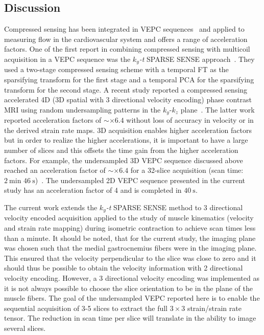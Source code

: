 \subsection{Discussion}
Compressed sensing has been integrated in VEPC sequences~\cite{RNCS9, RNCS10} and applied to measuring flow in the cardiovascular system and offers a range of acceleration factors. 
One of the first report in combining compressed sensing with multicoil acquisition in a VEPC sequence was the $k_y$\textit{-t} SPARSE SENSE approach~\cite{RNCS9, RNCS10}. 
They used a two-stage compressed sensing scheme with a temporal FT as the sparsifying transform for the first stage and a temporal PCA for the sparsifying transform for the second stage. 
A recent study reported a compressed sensing accelerated 4D (3D spatial with 3 directional velocity encoding) phase contrast MRI using random undersampling patterns in the $k_y$-$k_z$ plane~\cite{RNCS11}.
The latter work reported acceleration factors of $\sim \times 6.4$ without loss of accuracy in velocity or in the derived strain rate maps. 
3D acquisition enables higher acceleration factors but in order to realize the higher accelerations, it is important to have a large number of slices and this offsets the time gain from the higher acceleration factors. 
For example, the undersampled 3D VEPC sequence discussed above reached an acceleration factor of $\sim \times 6.4$ for a 32-slice acquisition (scan time: $\SI{2}{\minute}$ $\SI{46}{\second}$)~\cite{RNCS11}. 
The undersampled 2D VEPC sequence presented in the current study has an acceleration factor of 4 and is completed in $\SI{40}{\second}$.

The current work extends the $k_y$\textit{-t} SPARSE SENSE method to 3 directional velocity encoded acquisition applied to the study of muscle kinematics (velocity and strain rate mapping) during isometric contraction to achieve scan times less than a minute. 
It should be noted, that for the current study, the imaging plane was chosen such that the medial gastrocnemius fibers were in the imaging plane. 
This ensured that the velocity perpendicular to the slice was close to zero and it should thus be possible to obtain the velocity information with 2 directional velocity encoding. 
However, a 3 directional velocity encoding was implemented as it is not always possible to choose the slice orientation to be in the plane of the muscle fibers.
The goal of the undersampled VEPC reported here is to enable the sequential acquisition of 3-5 slices to extract the full $3 \times 3$ strain/strain rate tensor. 
The reduction in scan time per slice will translate in the ability to image several slices. 

